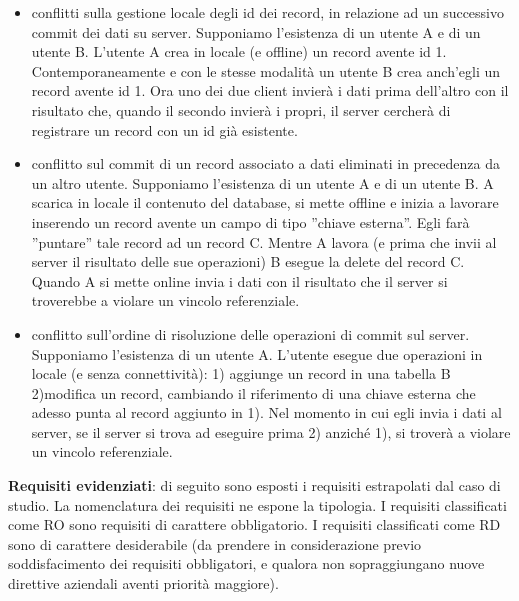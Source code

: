 \documentclass[10pt,a4paper,onecolumn]{article}
\begin{document}
\begin{itemize}
	\item conflitti sulla gestione locale degli id dei record, in relazione ad un successivo commit dei dati su server. Supponiamo l'esistenza di un utente A e di un utente B. L'utente A crea in locale (e offline) un record avente id 1. Contemporaneamente e con le stesse modalità un utente B crea anch'egli un record avente id 1. Ora uno dei due client invierà i dati prima dell'altro con il risultato che, quando il secondo invierà i propri, il server cercherà di registrare un record con un id già esistente.
	\item conflitto sul commit di un record associato a dati eliminati in precedenza da un altro utente. Supponiamo l'esistenza di un utente A e di un utente B. A scarica in locale il contenuto del database, si mette offline e inizia a lavorare inserendo un record avente un campo di tipo ''chiave esterna''. Egli farà ''puntare'' tale record ad un record C. Mentre A lavora (e prima che invii al server il risultato delle sue operazioni) B esegue la delete del record C. Quando A si mette online invia i dati con il risultato che il server si troverebbe a violare un vincolo referenziale.
	\item conflitto sull'ordine di risoluzione delle operazioni di commit sul server. Supponiamo l'esistenza di un utente A. L'utente esegue due operazioni in locale (e senza connettività): 1) aggiunge un record in una tabella B 2)modifica un record, cambiando il riferimento di una chiave esterna che adesso punta al record aggiunto in 1). Nel momento in cui egli invia i dati al server, se il server si trova ad eseguire prima 2) anziché 1), si troverà a violare un vincolo referenziale.
\end{itemize}

\textbf{Requisiti evidenziati}: di seguito sono esposti i requisiti estrapolati dal caso di studio. La nomenclatura dei requisiti ne espone la tipologia. I requisiti classificati come RO sono requisiti di carattere obbligatorio. I requisiti classificati come RD sono di carattere desiderabile (da prendere in considerazione previo soddisfacimento dei requisiti obbligatori, e qualora non sopraggiungano nuove direttive aziendali aventi priorità maggiore).
\end{document}
